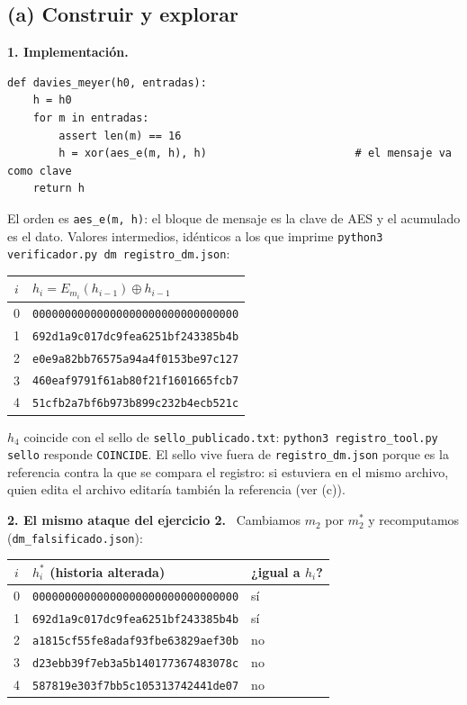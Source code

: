 \documentclass[11pt,letterpaper]{article}
\newcommand{\xor}{\oplus}
\newcommand{\paso}[1]{\par\smallskip\noindent\textbf{#1.}\ }
\begin{document}
\subsection*{(a) Construir y explorar}

\paso{1. Implementación}
\begin{lstlisting}[style=py]
def davies_meyer(h0, entradas):
    h = h0
    for m in entradas:
        assert len(m) == 16
        h = xor(aes_e(m, h), h)                       # el mensaje va como clave
    return h
\end{lstlisting}
El orden es \texttt{aes\_e(m, h)}: el bloque de mensaje es la clave de AES y el acumulado es el dato.
Valores intermedios, idénticos a los que imprime \texttt{python3 verificador.py dm registro\_dm.json}:

\begin{center}
\begin{tabular}{cl}
\toprule
$i$ & $h_i = E_{m_i}(h_{i-1})\xor h_{i-1}$\\
\midrule
0 & \texttt{00000000000000000000000000000000}\\
1 & \texttt{692d1a9c017dc9fea6251bf243385b4b}\\
2 & \texttt{e0e9a82bb76575a94a4f0153be97c127}\\
3 & \texttt{460eaf9791f61ab80f21f1601665fcb7}\\
4 & \texttt{51cfb2a7bf6b973b899c232b4ecb521c}\\
\bottomrule
\end{tabular}
\end{center}

$h_4$ coincide con el sello de \texttt{sello\_publicado.txt}: \texttt{python3 registro\_tool.py sello}
responde \texttt{COINCIDE}. El sello vive fuera de \texttt{registro\_dm.json} porque es la
referencia contra la que se compara el registro: si estuviera en el mismo archivo, quien edita el archivo
editaría también la referencia (ver (c)).

\paso{2. El mismo ataque del ejercicio 2}
Cambiamos $m_2$ por $m_2^*$ y recomputamos (\texttt{dm\_falsificado.json}):

\begin{center}
\begin{tabular}{cll}
\toprule
$i$ & $h_i^*$ (historia alterada) & ¿igual a $h_i$?\\
\midrule
0 & \texttt{00000000000000000000000000000000} & sí\\
1 & \texttt{692d1a9c017dc9fea6251bf243385b4b} & sí\\
2 & \texttt{a1815cf55fe8adaf93fbe63829aef30b} & no\\
3 & \texttt{d23ebb39f7eb3a5b140177367483078c} & no\\
4 & \texttt{587819e303f7bb5c105313742441de07} & no\\
\bottomrule
\end{tabular}
\end{center}
\end{document}
